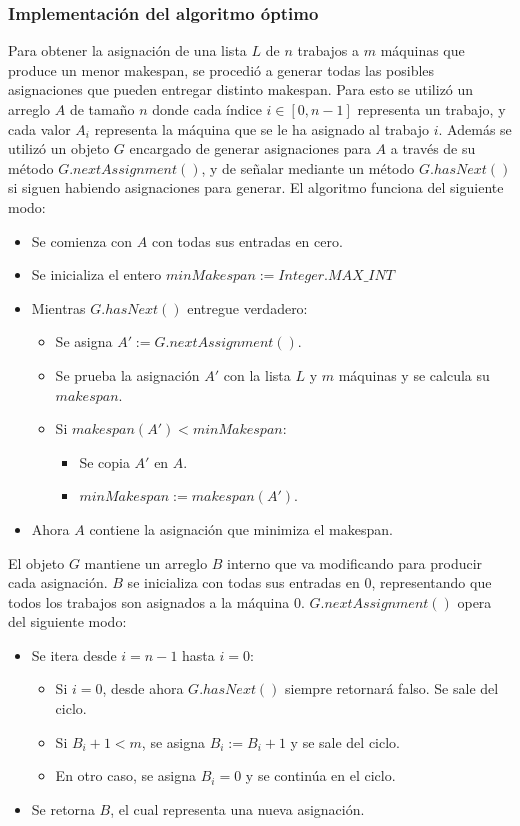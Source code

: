 \documentclass[12pt,letterpaper]{article}
\begin{document}
\subsubsection{Implementación del algoritmo óptimo}
	Para obtener la asignación de una lista $L$ de $n$ trabajos a $m$ máquinas que produce un menor makespan, se procedió a generar todas las posibles asignaciones que pueden entregar distinto makespan. Para esto se utilizó un arreglo $A$ de tamaño $n$ donde cada índice $i \in [0, n-1]$ representa un trabajo, y cada valor $A_{i}$ representa la máquina que se le ha asignado al trabajo $i$. Además se utilizó un objeto $G$ encargado de generar asignaciones para $A$ a través de su método $G.nextAssignment()$, y de señalar mediante un método $G.hasNext()$ si siguen habiendo asignaciones para generar. El algoritmo funciona del siguiente modo:
	
\begin{itemize}
\item Se comienza con $A$ con todas sus entradas en cero.
\item Se inicializa el entero $minMakespan := Integer.MAX\_INT$
\item Mientras $G.hasNext()$ entregue verdadero:
	\begin{itemize}
	\item Se asigna $A' := G.nextAssignment()$.
	\item Se prueba la asignación $A'$ con la lista $L$ y $m$ máquinas y se calcula su $makespan$.
	\item Si $makespan(A') < minMakespan$:
		\begin{itemize}
		\item Se copia $A'$ en $A$. 
		\item $minMakespan := makespan(A')$.
		\end{itemize}
	\end{itemize}
\item Ahora $A$ contiene la asignación que minimiza el makespan.
\end{itemize}
	
	 El objeto $G$ mantiene un arreglo $B$ interno que va modificando para producir cada asignación. $B$ se inicializa con todas sus entradas en $0$, representando que todos los trabajos son asignados a la máquina $0$. $G.nextAssignment()$ opera del siguiente modo:

\begin{itemize}
\item Se itera desde $i = n-1$ hasta $i = 0$:
	\begin{itemize}
	\item Si $i = 0$, desde ahora $G.hasNext()$ siempre retornará falso. Se sale del ciclo.
	\item Si $B_{i} + 1 < m$, se asigna $B_{i} := B_{i} + 1$ y se sale del ciclo.
	\item En otro caso, se asigna $B_{i} = 0$ y se continúa en el ciclo.
	\end{itemize}
\item Se retorna $B$, el cual representa una nueva asignación.
\end{itemize}
\end{document}
